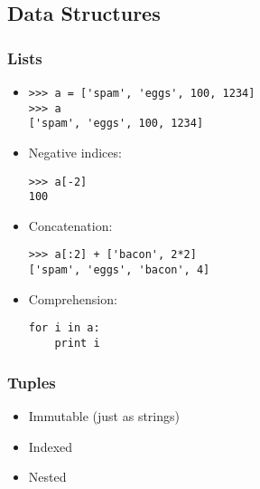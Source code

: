 \documentclass{beamer}
\begin{document}
\subsection{Data Structures}

\begin{frame}[fragile]
    \frametitle{Lists}
    \begin{itemize}

        \item<1-> \begin{verbatim}
>>> a = ['spam', 'eggs', 100, 1234]
>>> a
['spam', 'eggs', 100, 1234]
            \end{verbatim}

        \item<2-> Negative indices:
            \begin{verbatim}
>>> a[-2]
100
            \end{verbatim}

        \item<3-> Concatenation:
            \begin{verbatim}
>>> a[:2] + ['bacon', 2*2]
['spam', 'eggs', 'bacon', 4]
            \end{verbatim}

        \item<4-> Comprehension:
            \begin{verbatim}
for i in a:
    print i
            \end{verbatim}

    \end{itemize}
\end{frame}

\begin{frame}
    \frametitle{Tuples}
    \begin{itemize}
        \item<1-> Immutable (just as strings)
        \item<2-> Indexed
        \item<3-> Nested
    \end{itemize}
\end{frame}
\end{document}
